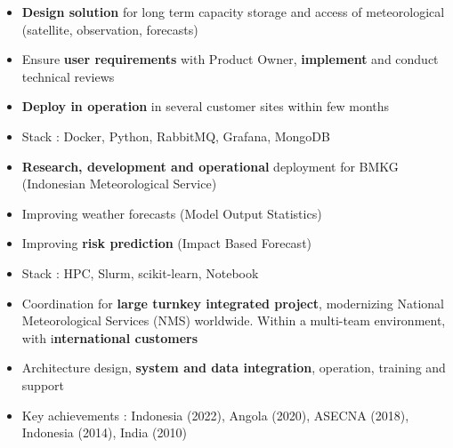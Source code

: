 \documentclass[10pt,a4paper,ragged2e,withhyper]{altacv}
\begin{document}
\begin{paracol}{2}



\begin{itemize}
\item \textbf{Design solution} for long term capacity storage and access of meteorological (satellite, observation, forecasts)
\item Ensure \textbf{user requirements} with Product Owner, \textbf{implement} and conduct technical reviews
\item \textbf{Deploy in operation} in several customer sites within few months
\item Stack : Docker, Python, RabbitMQ, Grafana, MongoDB
\end{itemize}

\divider

\begin{itemize}
\item \textbf{Research, development and operational} deployment for BMKG (Indonesian Meteorological Service)
\item Improving weather forecasts (Model Output Statistics)
\item Improving \textbf{risk prediction} (Impact Based Forecast)
\item Stack : HPC, Slurm, scikit-learn, Notebook
\end{itemize}

\divider

\begin{itemize}
\item Coordination for \textbf{large turnkey integrated project}, modernizing National Meteorological Services (NMS) worldwide. Within a multi-team environment, with i\textbf{nternational customers}
\item Architecture design, \textbf{system and data integration}, operation, training and support
\item Key achievements : Indonesia (2022), Angola (2020), ASECNA (2018), Indonesia (2014), India (2010)
\end{itemize}


\end{paracol}
\end{document}
